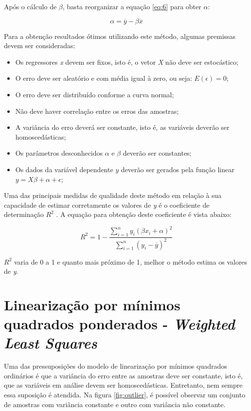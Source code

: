 Após o cálculo de $\beta$, basta reorganizar a equação \ref{eq:6} para obter $\alpha$:

\begin{equation}\label{eq:8}
  \alpha = \overline{y} - \beta \overline{x} 
\end{equation}

Para a obtenção resultados ótimos utilizando este método, algumas premissas devem ser consideradas:

\begin{itemize}
  \item Os regressores \textit{x} devem ser fixos, isto é, o vetor \textit{X} não deve ser estocástico;
  \item O erro deve ser aleatório e com média igual à zero, ou seja: $E(\epsilon) = 0$;
  \item O erro deve ser distribuído conforme a curva normal;
  \item Não deve haver correlação entre os erros das amostras;
  \item A variância do erro deverá ser constante, isto é, as variáveis deverão ser homoscedásticas;
  \item Os parâmetros desconhecidos $\alpha$ e $\beta$ deverão ser constantes;
  \item Os dados da variável dependente $y$ deverão ser gerados pela função linear $y = X\beta + \alpha + \epsilon$;
\end{itemize}

Uma das principais medidas de qualidade deste método em relação à sua capacidade de estimar corretamente os valores de \textit{y} é o coeficiente de determinação $R^2$ \cite{ols_intro_econometrics} \cite{conciseenclyclopediaofstatistics}. A equação para obtenção deste coeficiente é vista abaixo:

\begin{equation}\label{eq:9}
R^2 = 1 - \frac{\sum_{i=1}^{n} y_i(\beta x_i + \alpha)^2}{\sum_{i=1}^{n} (y_i - \overline{y})^2}
\end{equation}

$R^2$ varia de 0 a 1 e quanto mais próximo de 1, melhor o método estima os valores de \textit{y}.

\section{Linearização por mínimos quadrados ponderados - \textit{Weighted Least Squares}}

Uma das pressuposições do modelo de linearização por mínimos quadrados ordinários é que a variância do erro entre as amostras deve ser constante, isto é, que as variáveis em análise devem ser homoscedásticas. Entretanto, nem sempre essa suposição é atendida. Na figura \ref{fig:outlier}, é possível observar um conjunto de amostras com variância constante e outro com variância não constante.

